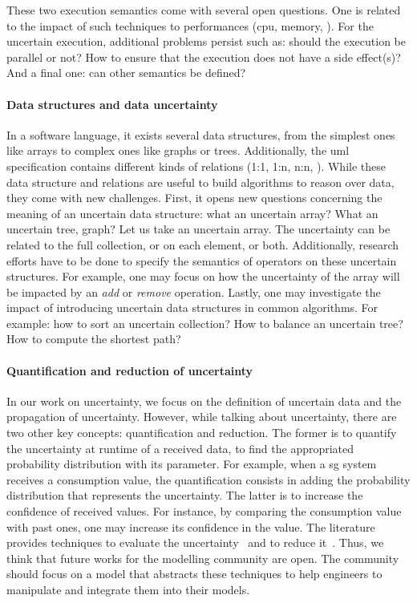 These two execution semantics come with several open questions.
One is related to the impact of such techniques to performances (\gls{cpu}, memory, \etc).
For the uncertain execution, additional problems persist such as: should the execution be parallel or not? How to ensure that the execution does not have a side effect(s)?
And a final one: can other semantics be defined?

\paragraph{Data structures and data uncertainty}
In a software language, it exists several data structures, from the simplest ones like arrays to complex ones like graphs or trees.
Additionally, the \gls{uml} specification contains different kinds of relations (1:1, 1:n, n:n, \etc).
While these data structure and relations are useful to build algorithms to reason over data, they come with new challenges.
First, it opens new questions concerning the meaning of an uncertain data structure: what an uncertain array? What an uncertain tree, graph?
Let us take an uncertain array.
The uncertainty can be related to the full collection, or on each element, or both.
Additionally, research efforts have to be done to specify the semantics of operators on these uncertain structures.
For example, one may focus on how the uncertainty of the array will be impacted by an \textit{add} or \textit{remove} operation.
Lastly, one may investigate the impact of introducing uncertain data structures in common algorithms.
For example: how to sort an uncertain collection? How to balance an uncertain tree? How to compute the shortest path?

\paragraph{Quantification and reduction of uncertainty}
In our work on uncertainty, we focus on the definition of uncertain data and the propagation of uncertainty.
However, while talking about uncertainty, there are two other key concepts: quantification and reduction.
The former is to quantify the uncertainty at runtime of a received data, \eg to find the appropriated probability distribution with its parameter.
For example, when a \gls{sg} system receives a consumption value, the quantification consists in adding the probability distribution that represents the uncertainty.
The latter is to increase the confidence of received values.
For instance, by comparing the consumption value with past ones, one may increase its confidence in the value.
The literature provides techniques to evaluate the uncertainty~\cite{wubbeler2008evaluation, metrology2008evaluation} and to reduce it~\cite{shafer1992dempster}.
Thus, we think that future works for the modelling community are open.
The community should focus on a \gls{model} that abstracts these techniques to help engineers to manipulate and integrate them into their models.

